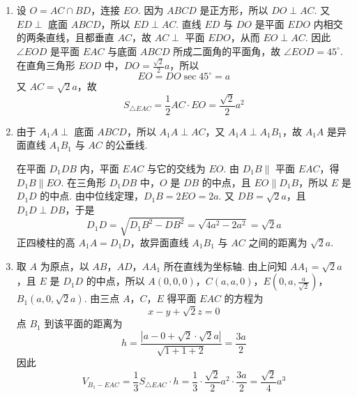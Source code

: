 \documentclass[UTF8,a4paper,oneside,11pt]{ctexbook}
\begin{document}
\begin{solution}
\begin{enumerate}
\item 设 \(O=AC\cap BD\)，连接 \(EO\). 因为 \(ABCD\) 是正方形，所以 \(DO\perp AC\). 又 \(ED\perp\) 底面 \(ABCD\)，所以 \(ED\perp AC\). 直线 \(ED\) 与 \(DO\) 是平面 \(EDO\) 内相交的两条直线，且都垂直 \(AC\)，故 \(AC\perp\) 平面 \(EDO\)，从而 \(EO\perp AC\). 因此 \(\angle EOD\) 是平面 \(EAC\) 与底面 \(ABCD\) 所成二面角的平面角，故 \(\angle EOD=45^\circ\). 在直角三角形 \(EOD\) 中，\(DO=\frac{\sqrt2}{2}a\)，所以
\[
EO=DO\sec45^\circ=a
\]
又 \(AC=\sqrt2a\)，故
\[
S_{\triangle EAC}=\frac12AC\cdot EO=\frac{\sqrt2}{2}a^2
\]

\item 由于 \(A_1A\perp\) 底面 \(ABCD\)，所以 \(A_1A\perp AC\)，又 \(A_1A\perp A_1B_1\)，故 \(A_1A\) 是异面直线 \(A_1B_1\) 与 \(AC\) 的公垂线.

在平面 \(D_1DB\) 内，平面 \(EAC\) 与它的交线为 \(EO\). 由 \(D_1B\parallel\) 平面 \(EAC\)，得 \(D_1B\parallel EO\). 在三角形 \(D_1DB\) 中，\(O\) 是 \(DB\) 的中点，且 \(EO\parallel D_1B\)，所以 \(E\) 是 \(D_1D\) 的中点. 由中位线定理，\(D_1B=2EO=2a\). 又 \(DB=\sqrt2a\)，且 \(D_1D\perp DB\)，于是
\[
D_1D=\sqrt{D_1B^2-DB^2}=\sqrt{4a^2-2a^2}=\sqrt2a
\]
正四棱柱的高 \(A_1A=D_1D\)，故异面直线 \(A_1B_1\) 与 \(AC\) 之间的距离为 \(\sqrt2a\).

\item 取 \(A\) 为原点，以 \(AB\)，\(AD\)，\(AA_1\) 所在直线为坐标轴. 由上问知 \(AA_1=\sqrt2a\)，且 \(E\) 是 \(D_1D\) 的中点，所以
\(A(0,0,0)\)，\(C(a,a,0)\)，\(E\left(0,a,\frac{a}{\sqrt2}\right)\)，\(B_1(a,0,\sqrt2a)\).
由三点 \(A\)，\(C\)，\(E\) 得平面 \(EAC\) 的方程为
\[
x-y+\sqrt2z=0
\]
点 \(B_1\) 到该平面的距离为
\[
h=\frac{\left|a-0+\sqrt2\cdot\sqrt2a\right|}{\sqrt{1+1+2}}=\frac{3a}{2}
\]
因此
\[
V_{B_1-EAC}=\frac13S_{\triangle EAC}\cdot h
=\frac13\cdot\frac{\sqrt2}{2}a^2\cdot\frac{3a}{2}=\frac{\sqrt2}{4}a^3
\]
\end{enumerate}
\end{solution}
\end{document}
